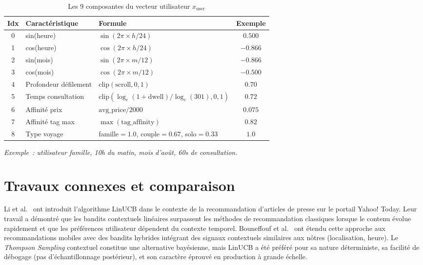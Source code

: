 \begin{table}[H]
    \centering
    \caption{Les 9 composantes du vecteur utilisateur $x_{\text{user}}$}
    \label{tab:user_vector}
    \small
    \begin{tabular}{c l l c}
        \toprule
        \textbf{Idx} & \textbf{Caractéristique} & \textbf{Formule} &
        \textbf{Exemple} \\
        \midrule
        0 & sin(heure) & $\sin(2\pi \times h / 24)$ & $0.500$ \\
        1 & cos(heure) & $\cos(2\pi \times h / 24)$ & $-0.866$ \\
        2 & sin(mois) & $\sin(2\pi \times m / 12)$ & $-0.866$ \\
        3 & cos(mois) & $\cos(2\pi \times m / 12)$ & $-0.500$ \\
        4 & Profondeur défilement & $\text{clip}(\text{scroll}, 0, 1)$ & $0.70$ \\
        5 & Temps consultation & $\text{clip}(\log_e(1+\text{dwell})/\log_e(301), 0, 1)$ & $0.72$ \\
        6 & Affinité prix & $\text{avg\_price} / 2000$ & $0.075$ \\
        7 & Affinité tag max & $\max(\text{tag\_affinity})$ & $0.82$ \\
        8 & Type voyage & famille$=1.0$, couple$=0.67$, solo$=0.33$ & $1.0$ \\
        \bottomrule
    \end{tabular}
    \vspace{0.2cm}
    \footnotesize
    \begin{minipage}{10cm}
        \vspace{0.2cm}
        \footnotesize \textit{Exemple~: utilisateur famille, 10h du matin, mois d'août, 60s de consultation.}
    \end{minipage}
\end{table}





\section{Travaux connexes et comparaison}

Li et al.~\cite{li2010linucb} ont introduit l'algorithme LinUCB dans le contexte de la
recommandation d'articles de presse sur le portail Yahoo! Today. Leur travail a démontré que
les bandits contextuels linéaires surpassent les méthodes de recommandation classiques lorsque
le contenu évolue rapidement et que les préférences utilisateur dépendent du contexte temporel.
Bouneffouf et al.~\cite{bouneffouf2014context} ont étendu cette approche aux recommandations
mobiles avec des bandits hybrides intégrant des signaux contextuels similaires aux nôtres
(localisation, heure). Le \textit{Thompson Sampling} contextuel constitue une alternative
bayésienne, mais LinUCB a été préféré pour sa nature déterministe, sa facilité de débogage
(pas d'échantillonnage postérieur), et son caractère éprouvé en production à grande échelle.


